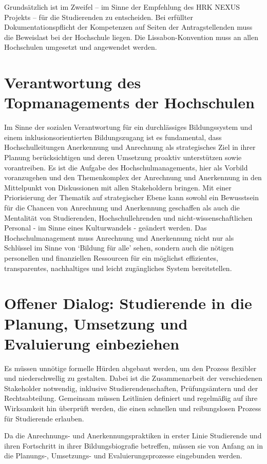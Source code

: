 \documentclass[DIV=calc]{scrartcl}
\begin{document}
Grundsätzlich ist im Zweifel – im Sinne der Empfehlung des HRK NEXUS Projekts – für die Studierenden zu entscheiden. Bei erfüllter Dokumentationspflicht der Kompetenzen auf Seiten der Antragstellenden muss die Beweislast bei der Hochschule liegen. Die Lissabon-Konvention muss an allen Hochschulen umgesetzt und angewendet werden.

\section*{Verantwortung des Topmanagements der Hochschulen}

Im Sinne der sozialen Verantwortung für ein durchlässiges Bildungssystem und einem inklusionsorientierten Bildungszugang ist es fundamental, dass Hochschulleitungen Anerkennung und Anrechnung als strategisches Ziel in ihrer Planung berücksichtigen und deren Umsetzung proaktiv unterstützen sowie vorantreiben. Es ist die Aufgabe des Hochschulmanagements, hier als Vorbild voranzugehen und den Themenkomplex der Anrechnung und Anerkennung in den Mittelpunkt von Diskussionen mit allen Stakeholdern bringen. Mit einer Priorisierung der Thematik auf strategischer Ebene kann sowohl ein Bewusstsein für die Chancen von Anrechnung und Anerkennung geschaffen als auch die Mentalität von Studierenden, Hochschullehrenden und nicht-wissenschaftlichen Personal - im Sinne eines Kulturwandels - geändert werden. Das Hochschulmanagement muss Anrechnung und Anerkennung nicht nur als Schlüssel im Sinne von ‘Bildung für alle’ sehen, sondern auch die nötigen personellen und finanziellen Ressourcen für ein möglichst effizientes, transparentes, nachhaltiges und leicht zugängliches System bereitstellen.

\section*{Offener Dialog: Studierende in die Planung, Umsetzung und Evaluierung einbeziehen}

Es müssen unnötige formelle Hürden abgebaut werden, um den Prozess flexibler und niederschwellig zu gestalten. Dabei ist die Zusammenarbeit der verschiedenen Stakeholder notwendig, inklusive Studierendenschaften, Prüfungsämtern und der Rechtsabteilung. Gemeinsam müssen Leitlinien definiert und regelmäßig auf ihre Wirksamkeit hin überprüft werden, die einen schnellen und reibungslosen Prozess für Studierende erlauben.

Da die Anrechnungs- und Anerkennungspraktiken in erster Linie Studierende und ihren Fortschritt in ihrer Bildungsbiografie betreffen, müssen sie von Anfang an in die Planungs-, Umsetzungs- und Evaluierungsprozesse eingebunden werden.
\end{document}
